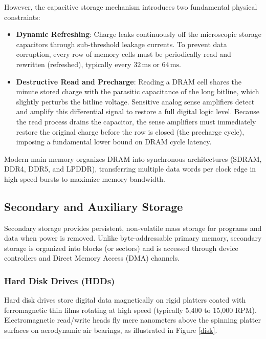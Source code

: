 However, the capacitive storage mechanism introduces two fundamental physical constraints:
\begin{itemize}
    \item \textbf{Dynamic Refreshing}: Charge leaks continuously off the microscopic storage capacitors through sub-threshold leakage currents. To prevent data corruption, every row of memory cells must be periodically read and rewritten (refreshed), typically every $32\,\text{ms}$ or $64\,\text{ms}$.
    \item \textbf{Destructive Read and Precharge}: Reading a DRAM cell shares the minute stored charge with the parasitic capacitance of the long bitline, which slightly perturbs the bitline voltage. Sensitive analog sense amplifiers detect and amplify this differential signal to restore a full digital logic level. Because the read process drains the capacitor, the sense amplifiers must immediately restore the original charge before the row is closed (the precharge cycle), imposing a fundamental lower bound on DRAM cycle latency.
\end{itemize}

Modern main memory organizes DRAM into synchronous architectures (SDRAM, DDR4, DDR5, and LPDDR), transferring multiple data words per clock edge in high-speed bursts to maximize memory bandwidth.

\subsection{Secondary and Auxiliary Storage}\label{sec:secondary_storage}

Secondary storage provides persistent, non-volatile mass storage for programs and data when power is removed. Unlike byte-addressable primary memory, secondary storage is organized into blocks (or sectors) and is accessed through device controllers and Direct Memory Access (DMA) channels.

\subsubsection{Hard Disk Drives (HDDs)}

Hard disk drives store digital data magnetically on rigid platters coated with ferromagnetic thin films rotating at high speed (typically 5,400 to 15,000 RPM). Electromagnetic read/write heads fly mere nanometers above the spinning platter surfaces on aerodynamic air bearings, as illustrated in Figure \ref{disk}.

